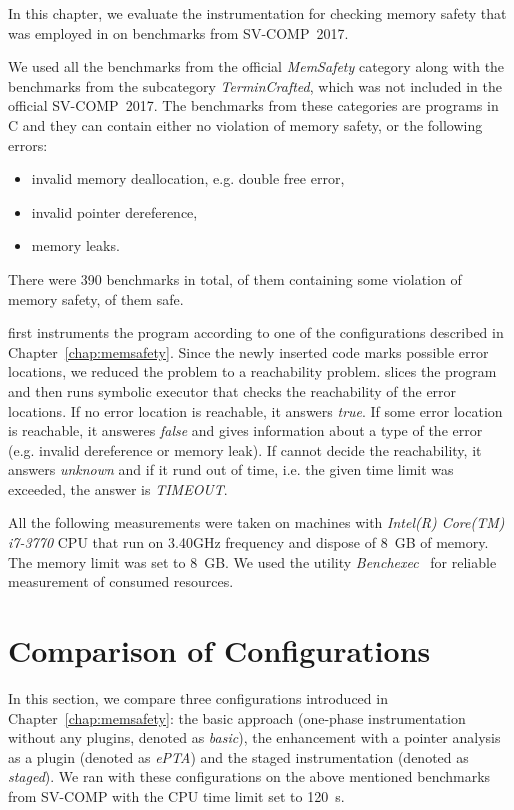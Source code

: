 In this chapter, we evaluate the instrumentation for checking memory safety
that was employed in \symbiotic on benchmarks from SV-COMP~2017.

We used all the benchmarks from the official \emph{MemSafety} category along
with the benchmarks from the subcategory \emph{TerminCrafted}, which was not
included in the official SV-COMP~2017. The benchmarks from these categories are
programs in C and they can contain either no violation of memory safety, or the
following errors:
\begin{itemize}
  \item invalid memory deallocation, e.g. double free error,
  \item invalid pointer dereference,
  \item memory leaks.
\end{itemize}
There were 390 benchmarks in total,  of them containing some violation
of memory safety,  of them safe.

\symbiotic first instruments the program according to one of the configurations
described in Chapter~\ref{chap:memsafety}. Since the newly inserted code marks
possible error locations, we reduced the problem to a reachability problem.
\symbiotic slices the program and then runs symbolic executor \klee that checks
the reachability of the error locations. If no error location is reachable, it
answers \emph{true}. If some error location is reachable, it answeres
\emph{false} and gives information about a type of the error (e.g.  invalid
dereference or memory leak). If \symbiotic cannot decide the reachability, it
answers \emph{unknown}  and if it rund out of time, i.e. the given time limit
was exceeded, the answer is \emph{TIMEOUT}.

All the following measurements were taken on machines with \textit{Intel(R)
Core(TM) i7-3770} CPU that run on 3.40GHz frequency and dispose of 8~GB of
memory. The memory limit was set to 8~GB. We used the utility
\emph{Benchexec}~\cite{Beyer2015} for reliable measurement of consumed
resources.

\section{Comparison of Configurations}
In this section, we compare three configurations introduced in
Chapter~\ref{chap:memsafety}: the basic approach (one-phase instrumentation
without any plugins, denoted as \emph{basic}), the enhancement with a pointer
analysis as a plugin (denoted as \emph{ePTA}) and the staged instrumentation
(denoted as \emph{staged}). We ran \symbiotic with these configurations on the
above mentioned benchmarks from SV-COMP with the CPU time limit set to 120~s.

